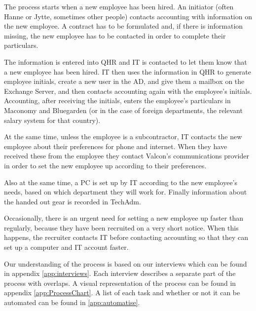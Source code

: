 The process starts when a new employee has been hired.
An initiator (often Hanne or Jytte, sometimes other people) contacts accounting with information on the new employee.
A contract has to be formulated and, if there is information missing, the new employee has to be contacted in order to complete their particulars.

The information is entered into QHR and IT is contacted to let them know that a new employee has been hired.
IT then uses the information in QHR to generate employee initials, create a new user in the AD, and give them a mailbox on the Exchange Server, and then contacts accounting again with the employee's initials.
Accounting, after receiving the initials, enters the employee's particulars in Maconomy and Bluegarden (or in the case of foreign departments, the relevant salary system for that country).

At the same time, unless the employee is a subcontractor, IT contacts the new employee about their preferences for phone and internet.
When they have received these from the employee they contact Valcon's communications provider in order to set the new employee up according to their preferences.

Also at the same time, a PC is set up by IT according to the new employee's needs, based on which department they will work for.
Finally information about the handed out gear is recorded in TechAdm.

Occasionally, there is an urgent need for setting a new employee up faster than regularly, because they have been recruited on a very short notice. When this happens, the recruiter contacts IT before contacting accounting so that they can set up a computer and IT account faster.

Our understanding of the process is based on our interviews which can be found in appendix \ref{app:interviews}. Each interview describes a separate part of the process with overlaps.
A visual representation of the process can be found in appendix \ref{app:ProcessChart}. A list of each task and whether or not it can be automated can be found in \ref{app:automatise}.
